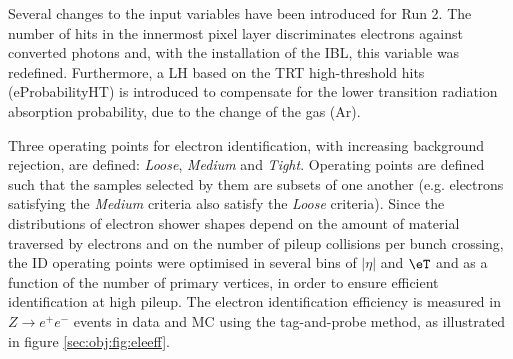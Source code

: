 \noindent Several changes to the input variables have been introduced for Run 2. The number of hits in the innermost pixel layer discriminates electrons against converted photons and, with the installation of the IBL, this variable was redefined. Furthermore, a LH based on the TRT high-threshold hits (eProbabilityHT) is introduced to compensate for the lower transition radiation absorption probability, due to the change of the gas (Ar). \par
Three operating points for electron identification, with increasing background rejection, are defined: {\sl Loose}, {\sl Medium} and {\sl Tight}. Operating points are defined such that the samples selected by them are subsets of one another (e.g. electrons satisfying the {\sl Medium} criteria also satisfy the {\sl Loose} criteria). Since the distributions of electron shower shapes depend on the amount of material traversed by electrons and on the number of pileup collisions per bunch crossing, the ID operating points were optimised in several bins of $|\eta|$ and $\eT$ and as a function of the number of primary vertices, in order to ensure efficient identification at high pileup. The electron identification efficiency is measured in $Z\to e^{+}e^{-}$ events in data and MC using the tag-and-probe method, as illustrated in figure \ref{sec:obj:fig:eleeff}.

